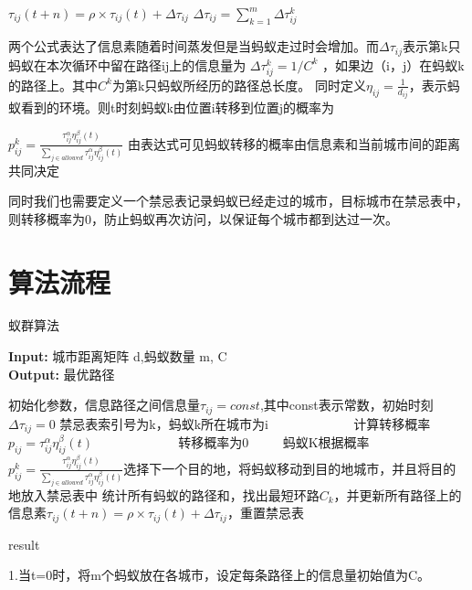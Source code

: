 \documentclass[12pt,nofonts]{ctexart}
\begin{document}
	$\tau_{ij}(t+n)=\rho \times \tau_{ij}(t)+\Delta\tau_{ij}$
	$\Delta\tau_{ij}=\sum_{k=1}^{m}\Delta\tau_{ij}^{k}$
	
	两个公式表达了信息素随着时间蒸发但是当蚂蚁走过时会增加。而$\Delta\tau_{ij}$表示第k只蚂蚁在本次循环中留在路径ij上的信息量为
	$\Delta\tau_{ij}^{k}=1/C^k$ ，如果边（i，j）在蚂蚁k的路径上。其中$C^k$为第k只蚂蚁所经历的路径总长度。
	同时定义$\eta_{ij}=\frac{1}{d_{ij}}$，表示蚂蚁看到的环境。则t时刻蚂蚁k由位置i转移到位置j的概率为

	$p_{ij}^{k}=\frac{\tau_{ij}^{\alpha}\eta_{ij}^{\beta}(t)}{\sum_{j\in allowed}\tau_{ij}^{\alpha}\eta_{ij}^{\beta}(t)}$
	由表达式可见蚂蚁转移的概率由信息素和当前城市间的距离共同决定

	同时我们也需要定义一个禁忌表记录蚂蚁已经走过的城市，目标城市在禁忌表中，则转移概率为0，防止蚂蚁再次访问，以保证每个城市都到达过一次。
\section{算法流程}
\begin{algorithm}[h]
\caption{蚁群算法} %
\hspace*{0.02in} {\bf Input:} %
城市距离矩阵 d,蚂蚁数量 m, C\\
\hspace*{0.02in} {\bf Output:} %
最优路径
\begin{algorithmic}[1]
\State 初始化参数，信息路径之间信息量$\tau_{ij}=const$,其中const表示常数，初始时刻$\Delta\tau_{ij}=0$ %
	\State 禁忌表索引号为k，蚂蚁k所在城市为i
　　　　\State 计算转移概率$p_{ij}=\tau_{ij}^{\alpha}\eta_{ij}^{\beta}(t)$
　　\Else
　　　　\State 转移概率为0
　　\EndIf
	\EndFor
	蚂蚁K根据概率$p_{ij}^{k}=\frac{\tau_{ij}^{\alpha}\eta_{ij}^{\beta}(t)}{\sum_{j\in allowed}\tau_{ij}^{\alpha}\eta_{ij}^{\beta}(t)}$选择下一个目的地，将蚂蚁移动到目的地城市，并且将目的地放入禁忌表中
	\EndFor
\EndFor
\State 统计所有蚂蚁的路径和，找出最短环路$C_k$，并更新所有路径上的信息素$\tau_{ij}(t+n)=\rho \times \tau_{ij}(t)+\Delta\tau_{ij}$，重置禁忌表
\EndWhile

\State \Return result
\end{algorithmic}
\end{algorithm}
1.当t=0时，将m个蚂蚁放在各城市，设定每条路径上的信息量初始值为C。
\end{document}
